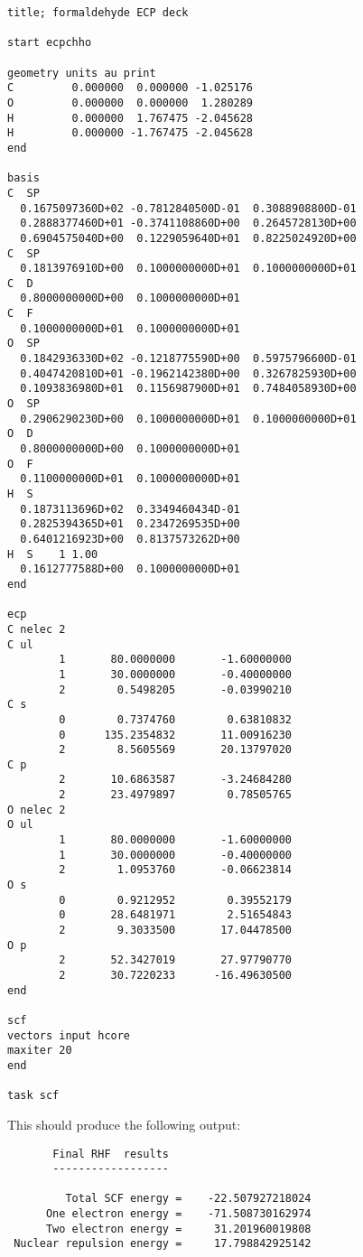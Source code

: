 \begin{verbatim}
title; formaldehyde ECP deck

start ecpchho

geometry units au print
C         0.000000  0.000000 -1.025176
O         0.000000  0.000000  1.280289
H         0.000000  1.767475 -2.045628
H         0.000000 -1.767475 -2.045628
end

basis 
C  SP
  0.1675097360D+02 -0.7812840500D-01  0.3088908800D-01
  0.2888377460D+01 -0.3741108860D+00  0.2645728130D+00
  0.6904575040D+00  0.1229059640D+01  0.8225024920D+00
C  SP
  0.1813976910D+00  0.1000000000D+01  0.1000000000D+01
C  D
  0.8000000000D+00  0.1000000000D+01
C  F
  0.1000000000D+01  0.1000000000D+01
O  SP
  0.1842936330D+02 -0.1218775590D+00  0.5975796600D-01
  0.4047420810D+01 -0.1962142380D+00  0.3267825930D+00
  0.1093836980D+01  0.1156987900D+01  0.7484058930D+00
O  SP
  0.2906290230D+00  0.1000000000D+01  0.1000000000D+01
O  D
  0.8000000000D+00  0.1000000000D+01
O  F
  0.1100000000D+01  0.1000000000D+01
H  S
  0.1873113696D+02  0.3349460434D-01
  0.2825394365D+01  0.2347269535D+00
  0.6401216923D+00  0.8137573262D+00
H  S    1 1.00
  0.1612777588D+00  0.1000000000D+01
end

ecp
C nelec 2
C ul
        1       80.0000000       -1.60000000
        1       30.0000000       -0.40000000
        2        0.5498205       -0.03990210
C s
        0        0.7374760        0.63810832
        0      135.2354832       11.00916230
        2        8.5605569       20.13797020
C p
        2       10.6863587       -3.24684280
        2       23.4979897        0.78505765
O nelec 2
O ul
        1       80.0000000       -1.60000000
        1       30.0000000       -0.40000000
        2        1.0953760       -0.06623814
O s
        0        0.9212952        0.39552179
        0       28.6481971        2.51654843
        2        9.3033500       17.04478500
O p
        2       52.3427019       27.97790770
        2       30.7220233      -16.49630500
end

scf
vectors input hcore
maxiter 20
end

task scf
\end{verbatim}

This should produce the following output:

\begin{verbatim}
       Final RHF  results 
       ------------------ 

         Total SCF energy =    -22.507927218024
      One electron energy =    -71.508730162974
      Two electron energy =     31.201960019808
 Nuclear repulsion energy =     17.798842925142
\end{verbatim}
